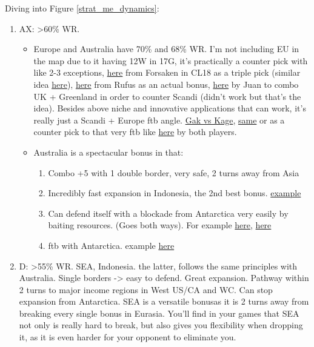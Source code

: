 Diving into Figure \ref{strat_me_dynamics}:
\begin{enumerate}
    \item AX: >60\% WR.
    \begin{itemize}
        \item Europe and Australia have 70\% and 68\% WR. I'm not including EU in the map due to it having 12W in 17G, it's practically a counter pick with like 2-3 exceptions, \href{https://www.warzone.com/MultiPlayer?GameID=40719588}{here} from Forsaken in CL18 as a triple pick (similar idea \href{https://www.warzone.com/MultiPlayer?GameID=38606079}{here}), \href{https://www.warzone.com/MultiPlayer?GameID=22938461}{here} from Rufus as an actual bonus, \href{https://www.warzone.com/MultiPlayer?GameID=37057617}{here} by Juan to combo UK + Greenland in order to counter Scandi (didn't work but that's the idea). Besides above niche and innovative applications that can work, it's really just a Scandi + Europe ftb angle. \href{https://www.warzone.com/MultiPlayer?GameID=32635176}{Gak vs Kage}, \href{https://www.warzone.com/MultiPlayer?GameID=32490164}{same} or as a counter pick to that very ftb like \href{https://www.warzone.com/MultiPlayer?GameID=18397489}{here} by both players. 
        \item Australia is a spectacular bonus in that:
        \begin{enumerate}
            \item Combo +5 with 1 double border, very safe, 2 turns away from Asia
            \item Incredibly fast expansion in Indonesia, the 2nd best bonus. \href{https://www.warzone.com/MultiPlayer?GameID=37030485}{example}
            \item Can defend itself with a blockade from Antarctica very easily by baiting resources. (Goes both ways). For example \href{https://www.warzone.com/MultiPlayer?GameID=33924215 }{here}, \href{https://www.warzone.com/MultiPlayer?GameID=37434686}{here}
            \item ftb with Antarctica. example \href{https://www.warzone.com/MultiPlayer?GameID=36889391}{here}
        \end{enumerate}
    \end{itemize}
    \item D: >55\% WR. SEA, Indonesia. the latter, follows the same principles with Australia. Single borders -> easy to defend. Great expansion. Pathway within 2 turns to major income regions in West US/CA and WC. Can stop expansion from Antarctica. SEA is a versatile bonusas it is 2 turns away from breaking every single bonus in Eurasia. You'll find in your games that SEA not only is really hard to break, but also gives you flexibility when dropping it, as it is even harder for your opponent to eliminate you.

\end{enumerate}

